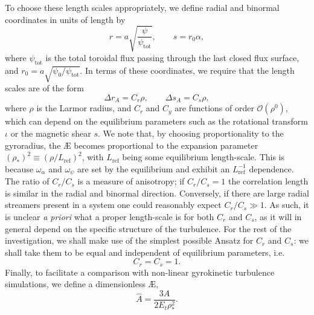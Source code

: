 \par 
To choose these length scales appropriately, we define radial and binormal coordinates in units of length by
\begin{equation}
    r = a \sqrt{\frac{\psi}{\psi_\mathrm{tot}}}, \qquad s = r_0 \alpha,
\end{equation}
where $\psi_\mathrm{tot}$ is the total toroidal flux passing through the last closed flux surface, and $r_0 = a \sqrt{\psi_0/\psi_\mathrm{tot}}$. In terms of these coordinates, we require that the length scales are of the form
\begin{equation}
    \Delta r_A = C_r \rho, \qquad \Delta s_A = C_s \rho,
\end{equation}
where $\rho$ is the Larmor radius, and $C_r$ and $C_y$ are functions of order $\mathcal{O}(\rho^0)$, which can depend on the equilibrium parameters such as the rotational transform $\iota$ or the magnetic shear $s$. We note that, by choosing proportionality to the gyroradius, the \AE{} becomes proportional to the expansion parameter $(\rho_*)^2 \equiv (\rho/L_\mathrm{ref})^2$, with $L_\mathrm{ref}$ being some equilibrium length-scale. This is because $\omega_\alpha$ and $\omega_\psi$ are set by the equilibrium and exhibit an $L_\mathrm{ref}^{-1}$ dependence. The ratio of $C_r/C_s$ is a measure of anisotropy; if $C_r/C_s=1$ the correlation length is similar in the radial and binormal direction. Conversely, if there are large radial streamers present in a system one could reasonably expect $C_r/C_s \gg 1$. As such, it is unclear \emph{a priori} what a proper length-scale is for both $C_r$ and $C_s$, as it will in general depend on the specific structure of the turbulence. For the rest of the investigation, we shall make use of the simplest possible Ansatz for $C_r$ and $C_s$: we shall take them to be equal and independent of equilibrium parameters, i.e. 
\begin{equation}
    C_r = C_s = 1.
\end{equation}
Finally, to facilitate a comparison with non-linear gyrokinetic turbulence simulations, we define a dimensionless \AE{},
\begin{equation}
    \widehat{A} = \frac{3 A}{2 E_t \rho_*^2}.
    \label{eq:normalized-AE-final}
\end{equation}
